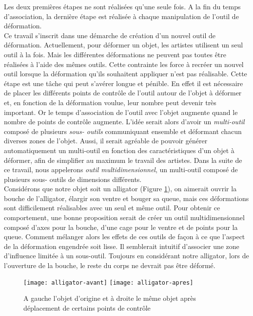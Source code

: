 Les deux premières étapes ne sont réalisées qu'une seule fois. A la fin du
temps d'association, la dernière étape est réalisée à chaque manipulation de
l'outil de déformation. \\

Ce travail s'inscrit dans une démarche de création d'un nouvel outil de
déformation. Actuellement, pour déformer un objet, les artistes utilisent un
seul outil à la fois. Mais les différentes déformations ne peuvent pas toutes
être réalisées à l'aide des mêmes outils. Cette contrainte les force à recréer
un nouvel outil lorsque la déformation qu'ils souhaitent appliquer n'est pas
réalisable. Cette étape est une tâche qui peut s'avérer longue et pénible. En
effet il est nécessaire de placer les différents points de contrôle de l'outil
autour de l'objet à déformer et, en fonction de la déformation voulue, leur
nombre peut devenir très important. Or le temps d'association de l'outil avec
l'objet augmente quand le nombre de points de contrôle augmente. L'idée serait
alors d'avoir un \textit {multi-outil} composé de plusieurs \textit{sous-
outils} communiquant ensemble et déformant chacun diverses zones de l'objet.
Aussi, il serait agréable de pouvoir générer automatiquement un multi-outil en
fonction des caractéristiques d'un objet à déformer, afin de simplifier au
maximum le travail des artistes. Dans la suite de ce travail, nous appelerons
\textit{outil multidimensionnel}, un multi-outil composé de plusieurs sous-
outils de dimensions différents. \\

Considérons que notre objet soit un alligator (Figure \ref{INTall}), on
aimerait ouvrir la bouche de l'alligator, élargir son ventre et bouger sa
queue, mais ces déformations sont difficilement réalisables avec un seul et
même outil. Pour obtenir ce comportement, une bonne proposition serait de
créer un outil multidimensionnel composé d'axes pour la bouche, d'une cage
pour le ventre et de points pour la queue. Comment mélanger alors les effets
de ces outils de façon à ce que l'aspect de la déformation engendrée soit
lisse. Il semblerait intuitif d'associer une zone d'influence limitée à un
sous-outil. Toujours en considérant notre alligator, lors de l'ouverture de la
bouche, le reste du corps ne devrait pas être déformé. \\

\begin{figure}[ht]
  \texttt{[image: alligator-avant]}
  \texttt{[image: alligator-apres]}

  \caption[Explication déformation multi-outil]   {A gauche l'objet d'origine
et à droite le même objet après déplacement de certains points de contrôle}

  \label{INTall}
\end{figure}

